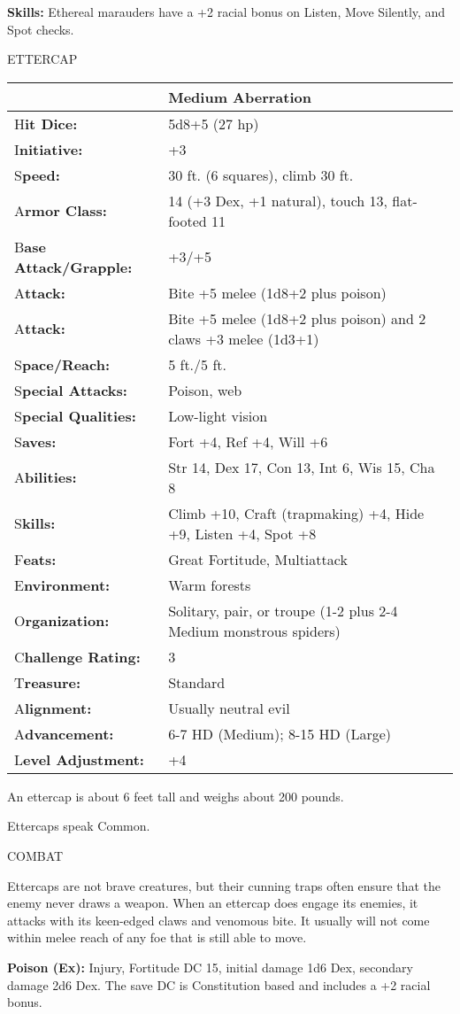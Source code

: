 \documentclass{article}
\begin{document}
\textbf{Skills:} Ethereal marauders have a +2 racial bonus on Listen, Move Silently, 
and Spot checks.

\vspace{12pt}
{\LARGE{}ETTERCAP}

\begin{tabular}{|>{\raggedright}p{84pt}|>{\raggedright}p{241pt}|}
\hline
  & Medium Aberration\tabularnewline
\hline
H\textbf{it Dice:} & 5d8+5 (27 hp)\tabularnewline
\hline
I\textbf{nitiative:} & +3\tabularnewline
\hline
S\textbf{peed:} & 30 ft. (6 squares), climb 30 ft.\tabularnewline
\hline
A\textbf{rmor Class:} & 14 (+3 Dex, +1 natural), touch 13, flat-footed 11\tabularnewline
\hline
B\textbf{ase Attack/Grapple:} & +3/+5\tabularnewline
\hline
A\textbf{ttack:} & Bite +5 melee (1d8+2 plus poison)\tabularnewline
\hline
A\textbf{ttack:} & Bite +5 melee (1d8+2 plus poison) and 2 claws +3 melee (1d3+1)\tabularnewline
\hline
S\textbf{pace/Reach:} & 5 ft./5 ft.\tabularnewline
\hline
S\textbf{pecial Attacks:} & Poison, web\tabularnewline
\hline
S\textbf{pecial Qualities:} & Low-light vision\tabularnewline
\hline
S\textbf{aves:} & Fort +4, Ref +4, Will +6\tabularnewline
\hline
A\textbf{bilities:} & Str 14, Dex 17, Con 13, Int 6, Wis 15, Cha 8\tabularnewline
\hline
S\textbf{kills:} & Climb +10, Craft (trapmaking) +4, Hide +9, Listen +4, Spot +8\tabularnewline
\hline
F\textbf{eats:} & Great Fortitude, Multiattack\tabularnewline
\hline
E\textbf{nvironment:} & Warm forests\tabularnewline
\hline
O\textbf{rganization:} & Solitary, pair, or troupe (1-2 plus 2-4 Medium monstrous 
spiders)\tabularnewline
\hline
C\textbf{hallenge Rating:} & 3\tabularnewline
\hline
T\textbf{reasure:} & Standard\tabularnewline
\hline
A\textbf{lignment:} & Usually neutral evil\tabularnewline
\hline
A\textbf{dvancement:} & 6-7 HD (Medium); 8-15 HD (Large)\tabularnewline
\hline
L\textbf{evel Adjustment:} & +4\tabularnewline
\hline
\end{tabular}

An ettercap is about 6 feet tall and weighs about 200 pounds.

Ettercaps speak Common.

COMBAT

Ettercaps are not brave creatures, but their cunning traps often ensure that the 
enemy never draws a weapon. When an ettercap does engage its enemies, it attacks 
with its keen-edged claws and venomous bite. It usually will not come within melee 
reach of any foe that is still able to move.

\textbf{Poison (Ex):} Injury, Fortitude DC 15, initial damage 1d6 Dex, secondary 
damage 2d6 Dex. The save DC is Constitution based and includes a +2 racial bonus.
\end{document}
